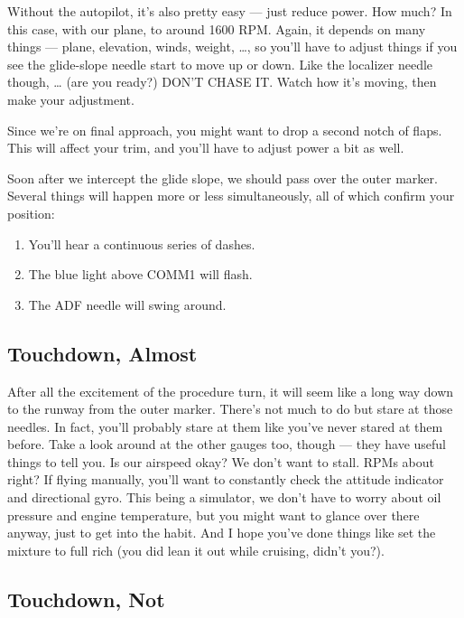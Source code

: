 Without the autopilot, it's also pretty easy --- just reduce power.
How much?  In this case, with our plane, to around 1600 RPM.  Again,
it depends on many things --- plane, elevation, winds, weight,
\ldots{}, so you'll have to adjust things if you see the glide-slope
needle start to move up or down.  Like the localizer needle though,
\ldots{} (are you ready?)  DON'T CHASE IT.  Watch how it's moving,
then make your adjustment.

Since we're on final approach, you might want to drop a second notch
of flaps.  This will affect your trim, and you'll have to adjust power
a bit as well.

Soon after we intercept the glide slope, we should pass over the outer
marker.  Several things will happen more or less simultaneously, all
of which confirm your position:

\begin{enumerate}
\item You'll hear a continuous series of dashes.
\item The blue light above COMM1 will flash.
\item The ADF needle will swing around.
\end{enumerate}

\subsection{Touchdown, Almost}

After all the excitement of the procedure turn, it will seem like a
long way down to the runway from the outer marker.  There's not much
to do but stare at those needles.  In fact, you'll probably stare at
them like you've never stared at them before.  Take a look around at
the other gauges too, though --- they have useful things to tell you.
Is our airspeed okay?  We don't want to stall.  RPMs about right?  If
flying manually, you'll want to constantly check the attitude
indicator and directional gyro.  This being a simulator, we don't have
to worry about oil pressure and engine temperature, but you might want
to glance over there anyway, just to get into the habit.  And I hope
you've done things like set the mixture to full rich (you did lean it
out while cruising, didn't you?).

\subsection{Touchdown, Not}


